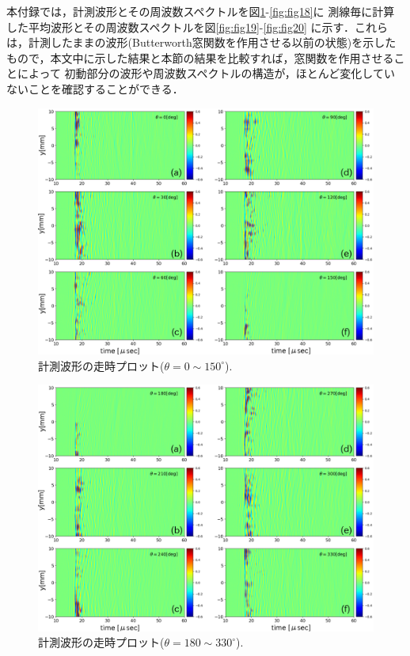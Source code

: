本付録では，計測波形とその周波数スペクトルを図\ref{fig:fig15}-\ref{fig:fig18}に
測線毎に計算した平均波形とその周波数スペクトルを図\ref{fig:fig19}-\ref{fig:fig20}
に示す．これらは，計測したままの波形(Butterworth窓関数を作用させる以前の状態)を示した
もので，本文中に示した結果と本節の結果を比較すれば，窓関数を作用させることによって
初動部分の波形や周波数スペクトルの構造が，ほとんど変化していないことを確認することができる．
\begin{figure}[h]
	\begin{center}
	\includegraphics[width=1.0\linewidth]{Figs/fig15.eps} 
	\end{center}
	\caption{
		計測波形の走時プロット($\theta=0\sim 150^{\circ}$).
	} 
	\label{fig:fig15}
\end{figure}
\begin{figure}[h]
	\begin{center}
	\includegraphics[width=1.0\linewidth]{Figs/fig16.eps} 
	\end{center}
	\caption{
		計測波形の走時プロット($\theta=180\sim 330^{\circ}$).
	} 
	\label{fig:fig16}
\end{figure}
